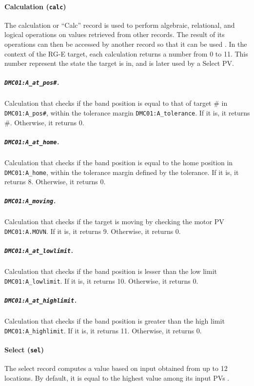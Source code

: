     \paragraph{Calculation (\texttt{calc})}
        The calculation or ``Calc'' record is used to perform algebraic, relational, and logical operations on values retrieved from other records.
        The result of its operations can then be accessed by another record so that it can be used \cite{stanley1998}.
        In the context of the RG-E target, each calculation returns a number from 0 to 11.
        This number represent the state the target is in, and is later used by a Select PV.

        \subparagraph{\texttt{DMC01:A\_at\_pos\#}.}
            Calculation that checks if the band position is equal to that of target \# in \texttt{DMC01:A\_pos\#}, within the tolerance margin \texttt{DMC01:A\_tolerance}.
            If it is, it returns \#.
            Otherwise, it returns 0.

        \subparagraph{\texttt{DMC01:A\_at\_home}.}
            Calculation that checks if the band position is equal to the home position in \texttt{DMC01:A\_home}, within the tolerance margin defined by the tolerance.
            If it is, it returns 8.
            Otherwise, it returns 0.
 
        \subparagraph{\texttt{DMC01:A\_moving}.}
            Calculation that checks if the target is moving by checking the motor PV \texttt{DMC01:A.MOVN}.
            If it is, it returns 9.
            Otherwise, it returns 0.
        
        \subparagraph{\texttt{DMC01:A\_at\_lowlimit}.}
            Calculation that checks if the band position is lesser than the low limit \texttt{DMC01:A\_lowlimit}.
            If it is, it returns 10.
            Otherwise, it returns 0.

        \subparagraph{\texttt{DMC01:A\_at\_highlimit}.}
            Calculation that checks if the band position is greater than the high limit \texttt{DMC01:A\_highlimit}.
            If it is, it returns 11.
            Otherwise, it returns 0.

    \paragraph{Select (\texttt{sel})}
        The select record computes a value based on input obtained from up to 12 locations.
        By default, it is equal to the highest value among its input PVs \cite{stanley1998}.

